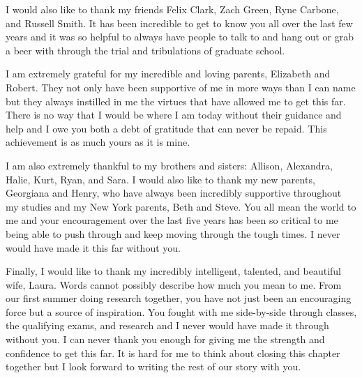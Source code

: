 I would also like to thank my friends Felix Clark, Zach Green, Ryne Carbone, and Russell Smith.  It has been incredible to get to know you all over the last few years and it was so helpful to always have people to talk to and hang out or grab a beer with through the trial and tribulations of graduate school.  


I am extremely grateful for my incredible and loving parents, Elizabeth and Robert.  They not only have been supportive of me in more ways than I can name but they always instilled in me the virtues that have allowed me to get this far.  There is no way that I would be where I am today without their guidance and help and I owe you both a debt of gratitude that can never be repaid.  This achievement is as much yours as it is mine.



I am also extremely thankful to my brothers and sisters: Allison, Alexandra, Halie, Kurt, Ryan, and Sara.  I would also like to thank my new parents, Georgiana and Henry, who have always been incredibly supportive throughout my studies and my New York parents, Beth and Steve.  You all mean the world to me and your encouragement over the last five years has been so critical to me being able to push through and keep moving through the tough times.  I never would have made it this far without you.


Finally, I would like to thank my incredibly intelligent, talented, and beautiful wife, Laura.  Words cannot possibly describe how much you mean to me.  From our first summer doing research together, you have not just been an encouraging force but a source of inspiration.  You fought with me side-by-side through classes, the qualifying exams, and research and I never would have made it through without you.  I can never thank you enough for giving me the strength and confidence to get this far.  It is hard for me to think about closing this chapter together but I look forward to writing the rest of our story with you.  %




